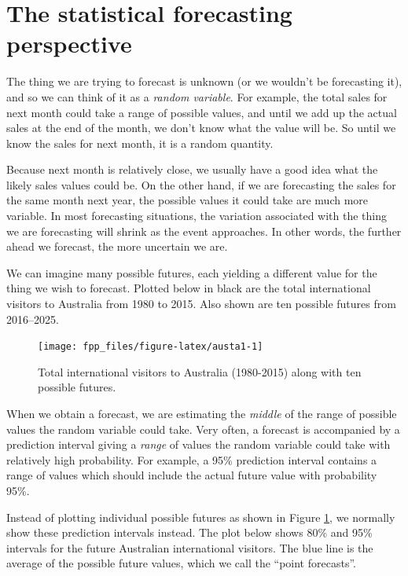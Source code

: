 \documentclass[]{book}
\begin{document}
\hypertarget{sec-perspective}{%
\section{The statistical forecasting perspective}\label{sec-perspective}}

The thing we are trying to forecast is unknown (or we wouldn't be forecasting it), and so we can think of it as a \emph{random variable}. For example, the total sales for next month could take a range of possible values, and until we add up the actual sales at the end of the month, we don't know what the value will be. So until we know the sales for next month, it is a random quantity.

Because next month is relatively close, we usually have a good idea what the likely sales values could be. On the other hand, if we are forecasting the sales for the same month next year, the possible values it could take are much more variable. In most forecasting situations, the variation associated with the thing we are forecasting will shrink as the event approaches. In other words, the further ahead we forecast, the more uncertain we are.

We can imagine many possible futures, each yielding a different value for the thing we wish to forecast. Plotted below in black are the total international visitors to Australia from 1980 to 2015. Also shown are ten possible futures from 2016--2025.

\begin{figure}

{\centering \texttt{[image: fpp\_files/figure-latex/austa1-1]} 

}

\caption{Total international visitors to Australia (1980-2015) along with ten possible futures.}\label{fig:austa1}
\end{figure}

When we obtain a forecast, we are estimating the \emph{middle} of the range of possible values the random variable could take. Very often, a forecast is accompanied by a prediction interval giving a \emph{range} of values the random variable could take with relatively high probability. For example, a 95\% prediction interval contains a range of values which should include the actual future value with probability 95\%.

Instead of plotting individual possible futures as shown in Figure \ref{fig:austa1}, we normally show these prediction intervals instead. The plot below shows 80\% and 95\% intervals for the future Australian international visitors. The blue line is the average of the possible future values, which we call the ``point forecasts''.
\end{document}
